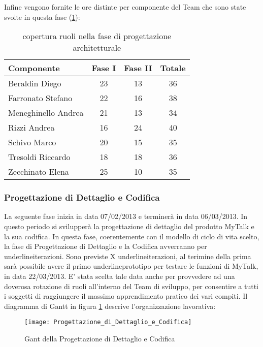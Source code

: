 Infine vengono fornite le ore distinte per componente del Team che sono state svolte in questa fase (\ref{tab:ruoliprog2}):\\
\begin{table}[h!]
\centering
\begin{tabular}{|l|c|c|c|}
\hline
Componente& Fase I& Fase II& Totale\\
\hline
Beraldin Diego &23 &13 & 36\\
Farronato Stefano & 22& 16& 38\\
Meneghinello Andrea & 21& 13& 34\\
Rizzi Andrea & 16& 24& 40\\
Schivo Marco & 20& 15& 35\\
Tresoldi Riccardo & 18& 18& 36\\
Zecchinato Elena & 25& 10& 35\\
\hline
\end{tabular}
\caption{copertura ruoli nella fase di progettazione architetturale}\label{tab:ruoliprog2}
\end{table}

\clearpage
\subsubsection{Progettazione di Dettaglio e Codifica}
La seguente fase inizia in data 07/02/2013 e terminerà in data 06/03/2013. In questo periodo si svilupperà la progettazione di dettaglio del prodotto MyTalk e la sua codifica.
In questa fase, coerentemente con il modello di ciclo di vita scelto, la fase di Progettazione di Dettaglio e la Codifica avverranno per underline{iterazioni}.
Sono previste X underline{iterazioni}, al terimine della prima sarà possibile avere il primo underline{prototipo} per testare le funzioni di MyTalk, in data 22/03/2013.
E' stata scelta tale data anche per provvedere ad una doverosa rotazione di ruoli all'interno del Team di sviluppo, per consentire a tutti i soggetti di raggiungere il massimo apprendimento pratico dei vari compiti.
Il diagramma di Gantt in figura \ref{fig:gantdc} descrive l'organizzazione lavorativa:\\

\begin{figure}[h!]
  \texttt{[image: Progettazione\_di\_Dettaglio\_e\_Codifica]}
\caption{Gant della Progettazione di Dettaglio e Codifica}\label{fig:gantdc}
\end{figure}


